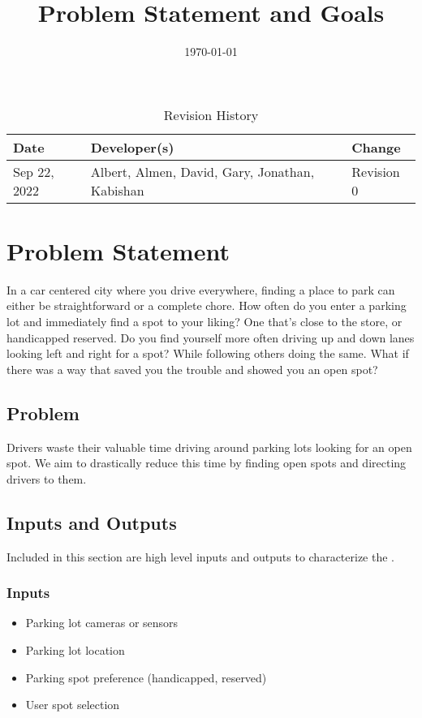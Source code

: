 \documentclass[12pt,letterpaper]{article}
\title{Problem Statement and Goals\\\progname}
\author{\authname}
\date{\today}
\begin{document}
\maketitle

\newpage

\begin{table}[hp]
\caption{Revision History} \label{TblRevisionHistory}
\begin{tabularx}{\textwidth}{lXX}
\toprule
\textbf{Date} & \textbf{Developer(s)} & \textbf{Change}\\
\midrule
Sep 22, 2022 & Albert, Almen, David, Gary, Jonathan, Kabishan & Revision 0\\
\bottomrule
\end{tabularx}
\end{table}

\newpage
\tableofcontents
\newpage
\listoftables
\newpage

\section{Problem Statement}

In a car centered city where you drive everywhere, finding a place to park can
either be straightforward or a complete chore. How often do you enter a parking
lot and immediately find a spot to your liking? One that's close to the store,
or handicapped reserved. Do you find yourself more often driving up and down
lanes looking left and right for a spot? While following others doing the same.
What if there was a way that saved you the trouble and showed you an open spot?

\subsection{Problem}
\label{problem}
Drivers waste their valuable time driving around parking lots looking for an
open spot. We aim to drastically reduce this time by finding open spots and
directing drivers to them.

\subsection{Inputs and Outputs}
Included in this section are high level inputs and outputs to characterize the
.

\subsubsection{Inputs}
\begin{itemize}
    \item Parking lot cameras or sensors
    \item Parking lot location
    \item Parking spot preference (handicapped, reserved)
    \item User spot selection
\end{itemize}
\end{document}
